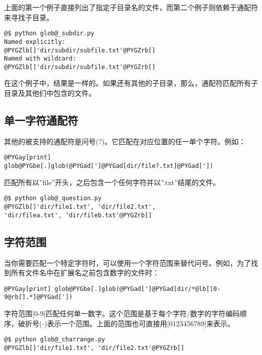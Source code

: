 \documentclass[a4paper,10pt,english]{manual}
\begin{document}
上面的第一个例子直接列出了指定子目录名的文件，而第二个例子则依赖于通配符来寻找子目录。

\begin{Verbatim}[commandchars=@\[\]]
@$ python glob@_subdir.py
Named explicitly:
@PYGZlb[]'dir/subdir/subfile.txt'@PYGZrb[]
Named with wildcard:
@PYGZlb[]'dir/subdir/subfile.txt'@PYGZrb[]
\end{Verbatim}

在这个例子中，结果是一样的。如果还有其他的子目录，那么，通配符匹配所有子目录及其他们中包含的文件。


\subsection{单一字符通配符}

其他的被支持的通配符是问号(?)。它匹配在对应位置的任一单个字符。例如：

\begin{Verbatim}[commandchars=@\[\]]
@PYGay[print] glob@PYGbe[.]glob(@PYGad[']@PYGad[dir/file?.txt]@PYGad['])
\end{Verbatim}

匹配所有以''file''开头，之后包含一个任何字符并以''.txt''结尾的文件。

\begin{Verbatim}[commandchars=@\[\]]
@$ python glob@_question.py
@PYGZlb[]'dir/file1.txt', 'dir/file2.txt',
'dir/filea.txt', 'dir/fileb.txt'@PYGZrb[]
\end{Verbatim}


\subsection{字符范围}

当你需要匹配一个特定字符时，可以使用一个字符范围来替代问号。例如，为了找到所有文件名中在扩展名之前包含数字的文件时：

\begin{Verbatim}[commandchars=@\[\]]
@PYGay[print] glob@PYGbe[.]glob(@PYGad[']@PYGad[dir/*@lb[]0-9@rb[].*]@PYGad['])
\end{Verbatim}

字符范围{[}0-9{]}匹配任何单一数字。这个范围是基于每个字符/数字的字符编码顺序，破折号(-)表示一个范围。上面的范围也可直接用{[}0123456789{]}来表示。

\begin{Verbatim}[commandchars=@\[\]]
@$ python glob@_charrange.py
@PYGZlb[]'dir/file1.txt', 'dir/file2.txt'@PYGZrb[]
\end{Verbatim}
\end{document}
